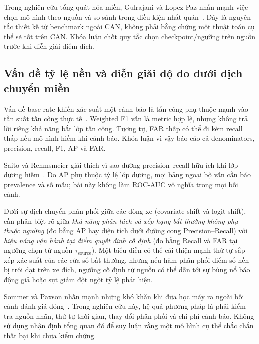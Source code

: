 \documentclass[12pt, a4paper, reqno, oneside]{book}
\begin{document}
Trong nghiên cứu tổng quát hóa miền, Gulrajani và Lopez-Paz nhấn mạnh việc chọn mô hình theo nguồn và so sánh trong điều kiện nhất quán~\cite{gulrajani2021domainbed}. Đây là nguyên tắc thiết kế từ benchmark ngoài CAN, không phải bằng chứng một thuật toán cụ thể sẽ tốt trên CAN. Khóa luận chốt quy tắc chọn checkpoint/ngưỡng trên nguồn trước khi diễn giải điểm đích.

\subsection{Vấn đề tỷ lệ nền và diễn giải độ đo dưới dịch chuyển miền}
Vấn đề base rate khiến xác suất một cảnh báo là tấn công phụ thuộc mạnh vào tần suất tấn công thực tế~\cite{axelsson2000base}. Weighted F1 vẫn là metric hợp lệ, nhưng không trả lời riêng khả năng bắt lớp tấn công. Tương tự, FAR thấp có thể đi kèm recall thấp nếu mô hình hiếm khi cảnh báo. Khóa luận vì vậy báo cáo cả denominators, precision, recall, F1, AP và FAR.

Saito và Rehmsmeier giải thích vì sao đường precision--recall hữu ích khi lớp dương hiếm~\cite{saito2015pr}. Do AP phụ thuộc tỷ lệ lớp dương, mọi bảng ngoại bộ vẫn cần báo prevalence và số mẫu; bài này không làm ROC-AUC vô nghĩa trong mọi bối cảnh.

Dưới sự dịch chuyển phân phối giữa các dòng xe (covariate shift và logit shift), cần phân biệt rõ giữa \textit{khả năng phân tách và xếp hạng bất thường không phụ thuộc ngưỡng} (đo bằng AP hay diện tích dưới đường cong Precision--Recall) với \textit{hiệu năng vận hành tại điểm quyết định cố định} (đo bằng Recall và FAR tại ngưỡng chọn từ nguồn $\tau_{\text{source}}$). Một biểu diễn có thể cải thiện mạnh thứ tự sắp xếp xác suất của các cửa sổ bất thường, nhưng nếu hàm phân phối điểm số nền bị trôi dạt trên xe đích, ngưỡng cố định từ nguồn có thể dẫn tới sự bùng nổ báo động giả hoặc sụt giảm đột ngột tỷ lệ phát hiện.

Sommer và Paxson nhấn mạnh những khó khăn khi đưa học máy ra ngoài bối cảnh đánh giá đóng~\cite{sommer2010outside}. Trong nghiên cứu này, hệ quả phương pháp là phải kiểm tra nguồn nhãn, thứ tự thời gian, thay đổi phân phối và chi phí cảnh báo. Không sử dụng nhận định tổng quan đó để suy luận rằng một mô hình cụ thể chắc chắn thất bại khi chưa kiểm chứng.
\end{document}

